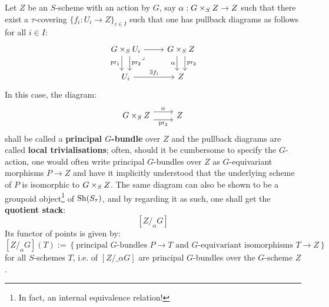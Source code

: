             \begin{definition} \label{def: principal_bundles_and_quotient_stacks}
                Let $Z$ be an $S$-scheme with an action by $G$, say $\alpha: G \x_S Z \to Z$ such that there exist a $\tau$-covering $\{f_i: U_i \to Z\}_{i \in I}$ such that one has pullback diagrams as follows for all $i \in I$:
                    $$
                        \begin{tikzcd}
                    	{G \x_S U_i} & {G \x_S Z} \\
                    	{U_i} & Z
                    	\arrow[from=1-1, to=1-2]
                    	\arrow["{\pr_1}"', shift right=2, from=1-1, to=2-1]
                    	\arrow["{\pr_2}", shift left=2, from=1-1, to=2-1]
                    	\arrow["\lrcorner"{anchor=center, pos=0.125}, draw=none, from=1-1, to=2-2]
                    	\arrow["{\pr_2}", shift left=2, from=1-2, to=2-2]
                    	\arrow["\alpha"', shift right=2, from=1-2, to=2-2]
                    	\arrow["{\exists f_i}", from=2-1, to=2-2]
                        \end{tikzcd}
                    $$
                In this case, the diagram:
                    $$
                        \begin{tikzcd}
                    	{G \x_S Z} & Z
                    	\arrow["\alpha", shift left=2, from=1-1, to=1-2]
                    	\arrow["{\pr_2}"', shift right=2, from=1-1, to=1-2]
                        \end{tikzcd}
                    $$
                shall be called a \textbf{principal $G$-bundle} over $Z$ and the pullback diagrams are called \textbf{local trivialisations}; often, should it be cumbersome to specify the $G$-action, one would often write principal $G$-bundles over $Z$ as $G$-equivariant morphisms $P \to Z$ and have it implicitly understood that the underlying scheme of $P$ is isomorphic to $G \x_S Z$. The same diagram can also be shown to be a groupoid object\footnote{In fact, an internal equivalence relation!} of $\mathrm{Sh}(S_{\tau})$, and by regarding it as such, one shall get the \textbf{quotient stack}:
                    $$[Z /_{\alpha} G]$$
                Its functor of points is given by:
                    $$[Z /_{\alpha} G](T) := \left\{ \text{principal $G$-bundles $P \to T$ and $G$-equivariant isomorphisms $T \to Z$} \right\}$$
                for all $S$-schemes $T$, i.e.  of $[Z/\_{\alpha}G]$ are principal $G$-bundles over the $G$-scheme $Z$.
            \end{definition}
